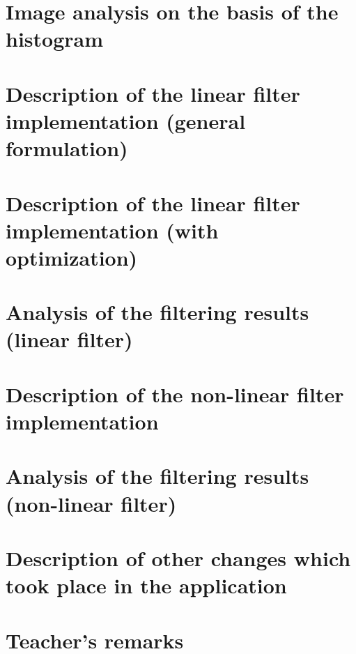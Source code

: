 \documentclass[12pt]{article}
\begin{document}
\section{Image analysis on the basis of the histogram}

\section{Description of the linear filter implementation (general formulation)}

\section{Description of the linear filter implementation (with optimization)}

\section{Analysis of the filtering results (linear filter)}

\section{Description of the non-linear filter implementation }

\section{Analysis of the filtering results (non-linear filter)}

\section{Description of other changes which took place in the application}



\vfill
\section*{Teacher's remarks}
\begin{tabularx}{\textwidth}{|X|}
    \hline
    \vspace{7cm}
    \phantom{.} \\
    \hline
\end{tabularx}
\end{document}
